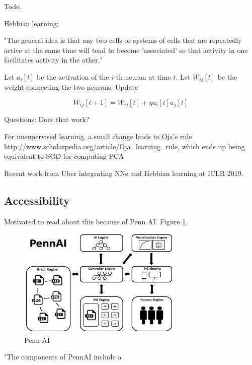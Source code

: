\documentclass[english]{article}
\begin{document}
\benum 
\item Todo.
\item Hebbian learning:

"The general idea is that any two cells or systems of cells that are repeatedly active at the same time will tend to become 'associated' so that activity in one facilitates activity in the other."

\item 

 Let $a_i[t]$ be the activation of the $i$-th neuron at time $t$. Let $W_{ij}[t]$ be the weight connecting the two neurons. Update

$$W_{ij}[t+1]=W_{ij}[t]+\eta a_i[t]a_j[t]$$

\item Questions: Does that work?

\item For unsupervised learning, a small change leads to Oja's rule \url{http://www.scholarpedia.org/article/Oja_learning_rule}, which ends up being equivalent to SGD for computing PCA


\item Recent work from Uber integrating NNs and Hebbian learning at ICLR 2019. 

\eenum 


\subsection{Accessibility}


\benum 
\item Motivated to read about this because of Penn AI. Figure \ref{Penn AI}.

\begin{figure}[h!]
  \centering
  \includegraphics[width=0.7\textwidth]{pennai}
  \caption{Penn AI}
  \label{Penn AI}
\end{figure}


\item "The components of PennAI include a 
\end{document}

